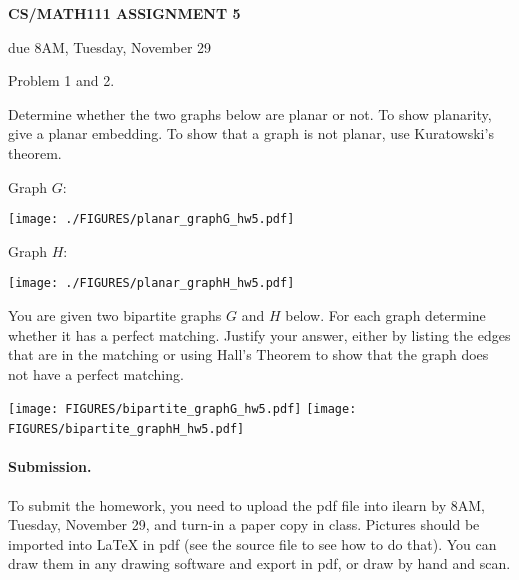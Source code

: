 \documentclass{article}
\newcommand{\hwduedate}{{8AM, Tuesday, November 29}}
\begin{document}
\centerline{\large \bf CS/MATH111 ASSIGNMENT 5}
\centerline{due {\hwduedate}}

\vskip 0.15in
 Problem 1 and 2.

\vskip 0.15in


\begin{problem}
Determine whether the two graphs below are planar or not.
To show planarity, give a planar embedding.
To show that a graph is not planar, use Kuratowski's theorem.

\begin{center}
{\large Graph $G$:\ }
\begin{minipage}{1.8in}
        \texttt{[image: ./FIGURES/planar\_graphG\_hw5.pdf]}
\end{minipage}
\hfill
{\large Graph $H$:\ }
\begin{minipage}{2in}
        \texttt{[image: ./FIGURES/planar\_graphH\_hw5.pdf]}
\end{minipage}
\end{center}
\end{problem}


\begin{problem}
	You are given two bipartite graphs $G$ and $H$ below. For each
	graph determine whether it has a perfect matching.
	Justify your answer, either by 
	listing the edges that are in the matching or using
	Hall's Theorem to show that the graph does not have a
	perfect matching.

	\begin{center}
	\texttt{[image: FIGURES/bipartite\_graphG\_hw5.pdf]}
	\quad\quad
	\texttt{[image: FIGURES/bipartite\_graphH\_hw5.pdf]}
	\quad\quad\ 
	\hfill\ 
	\end{center}
\end{problem}





\vskip 0.1in
\paragraph{Submission.}
To submit the homework, you need to upload the pdf file into ilearn by {\hwduedate},
and turn-in a paper copy in class.
Pictures should be 
imported into {\LaTeX} in pdf (see the source file to see
how to do that). You can draw them in any drawing
software and export in pdf, or draw by hand and scan.
\end{document}
